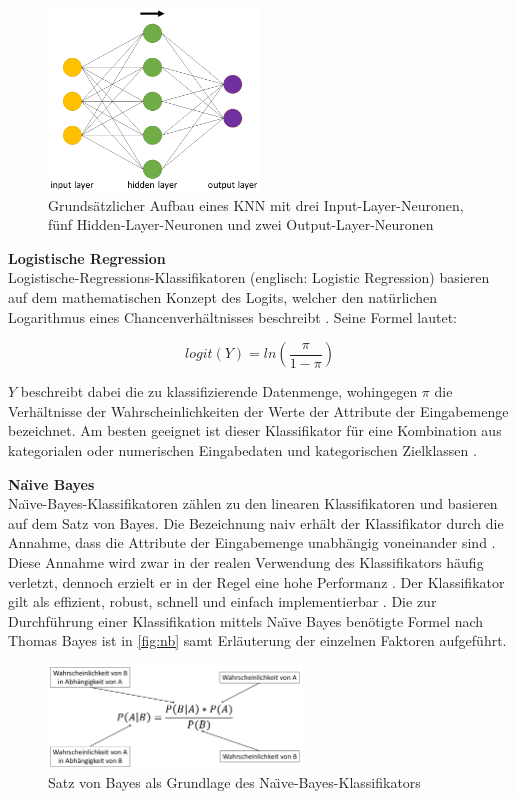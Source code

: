 \begin{figure}[ht]
    \centering
    \includegraphics[width=0.5\textwidth]{images/ANN}
    \caption{Grundsätzlicher Aufbau eines KNN mit drei Input-Layer-Neuronen, fünf Hidden-Layer-Neuronen und zwei Output-Layer-Neuronen\label{fig:ann}}
\end{figure}

\textbf{Logistische Regression\medskip}\\
Logistische-Regressions-Klassifikatoren (englisch: Logistic Regression) basieren auf dem mathematischen Konzept des Logits, welcher den natürlichen Logarithmus eines Chancenverhältnisses beschreibt \cite{Peng2002}. Seine Formel lautet:

\[logit(Y) = ln(\frac{\pi}{1-\pi})\]

$Y$ beschreibt dabei die zu klassifizierende Datenmenge, wohingegen $\pi$ die Verhältnisse der Wahrscheinlichkeiten der Werte der Attribute der Eingabemenge bezeichnet. Am besten geeignet ist dieser Klassifikator für eine Kombination aus kategorialen oder numerischen Eingabedaten und kategorischen Zielklassen \cite{Peng2002}.

\textbf{Na\"{\i}ve Bayes\medskip}\\
Na\"{\i}ve-Bayes-Klassifikatoren zählen zu den linearen Klassifikatoren und basieren auf dem Satz von Bayes. Die Bezeichnung \glqq naiv\grqq{} erhält der Klassifikator durch die Annahme, dass die Attribute der Eingabemenge unabhängig voneinander sind \cite{Raschka2014}. Diese Annahme wird zwar in der realen Verwendung des Klassifikators häufig verletzt, dennoch erzielt er in der Regel eine hohe Performanz \cite{Raschka2014}. Der Klassifikator gilt als effizient, robust, schnell und einfach implementierbar \cite{Raschka2014}. Die zur Durchführung einer Klassifikation mittels Na\"{\i}ve Bayes benötigte Formel nach Thomas Bayes ist in \autoref{fig:nb} samt Erläuterung der einzelnen Faktoren aufgeführt.

\begin{figure}[ht]
    \centering
    \includegraphics[width=0.6\textwidth]{images/NB}
    \caption{Satz von Bayes als Grundlage des Na\"{\i}ve-Bayes-Klassifikators\label{fig:nb}}
\end{figure}

